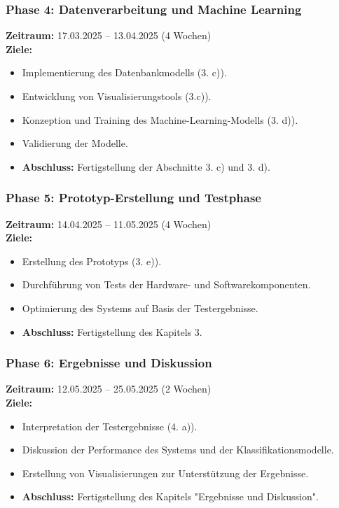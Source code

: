 \documentclass{scrartcl}
\begin{document}
\subsubsection*{Phase 4: Datenverarbeitung und Machine Learning}
\textbf{Zeitraum:} 17.03.2025 – 13.04.2025 (4 Wochen)  \\
\textbf{Ziele:}
\begin{itemize}
	\item Implementierung des Datenbankmodells (3. c)).
	\item Entwicklung von Visualisierungstools (3.c)).
	\item Konzeption und Training des Machine-Learning-Modells (3. d)).
	\item Validierung der Modelle.
	\item \textbf{Abschluss:} Fertigstellung der Abschnitte 3. c) und 3. d).
\end{itemize}

\subsubsection*{Phase 5: Prototyp-Erstellung und Testphase}
\textbf{Zeitraum:} 14.04.2025 – 11.05.2025 (4 Wochen)  \\
\textbf{Ziele:}
\begin{itemize}
	\item Erstellung des Prototyps (3. e)).
	\item Durchführung von Tests der Hardware- und Softwarekomponenten.
	\item Optimierung des Systems auf Basis der Testergebnisse.
	\item \textbf{Abschluss:} Fertigstellung des Kapitels 3.
\end{itemize}

\subsubsection*{Phase 6: Ergebnisse und Diskussion}
\textbf{Zeitraum:} 12.05.2025 – 25.05.2025 (2 Wochen)  \\
\textbf{Ziele:}
\begin{itemize}
	\item Interpretation der Testergebnisse (4. a)).
	\item Diskussion der Performance des Systems und der Klassifikationsmodelle.
	\item Erstellung von Visualisierungen zur Unterstützung der Ergebnisse.
	\item \textbf{Abschluss:} Fertigstellung des Kapitels "Ergebnisse und Diskussion".
\end{itemize}
\end{document}
